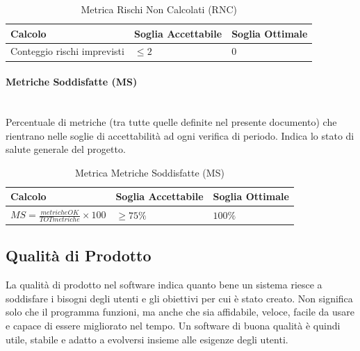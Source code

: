 \documentclass[11pt,a4paper]{article}
\begin{document}
\begin{table}[H]
    \centering
    \renewcommand{\arraystretch}{1.5}
    \begin{tabular}{|M{0.4\textwidth}|M{0.25\textwidth}|M{0.25\textwidth}|}
        \hline
        \textbf{Calcolo} & \textbf{Soglia Accettabile} & \textbf{Soglia Ottimale} \\
        \hline
        Conteggio rischi imprevisti & $\le 2$ & $0$ \\
        \hline
    \end{tabular}
    \caption{Metrica Rischi Non Calcolati (RNC)}
\end{table}

\paragraph{Metriche Soddisfatte (MS)} \hfill \\
Percentuale di metriche (tra tutte quelle definite nel presente documento) che rientrano nelle soglie di accettabilità ad ogni verifica di periodo. Indica lo stato di salute generale del progetto.

\begin{table}[H]
    \centering
    \renewcommand{\arraystretch}{1.5}
    \begin{tabular}{|M{0.4\textwidth}|M{0.25\textwidth}|M{0.25\textwidth}|}
        \hline
        \textbf{Calcolo} & \textbf{Soglia Accettabile} & \textbf{Soglia Ottimale} \\
        \hline
        $MS = \frac{metricheOK}{TOTmetriche} \times 100$ & $\ge 75\%$ & $100\%$ \\
        \hline
    \end{tabular}
    \caption{Metrica Metriche Soddisfatte (MS)}
\end{table}


\newpage
\subsection{Qualità di Prodotto}
La qualità di prodotto nel software indica quanto bene un sistema riesce a soddisfare i bisogni degli utenti e gli obiettivi per cui è stato creato. Non significa solo che il programma funzioni, ma anche che sia affidabile, veloce, facile da usare e capace di essere migliorato nel tempo. Un software di buona qualità è quindi utile, stabile e adatto a evolversi insieme alle esigenze degli utenti.
\end{document}
